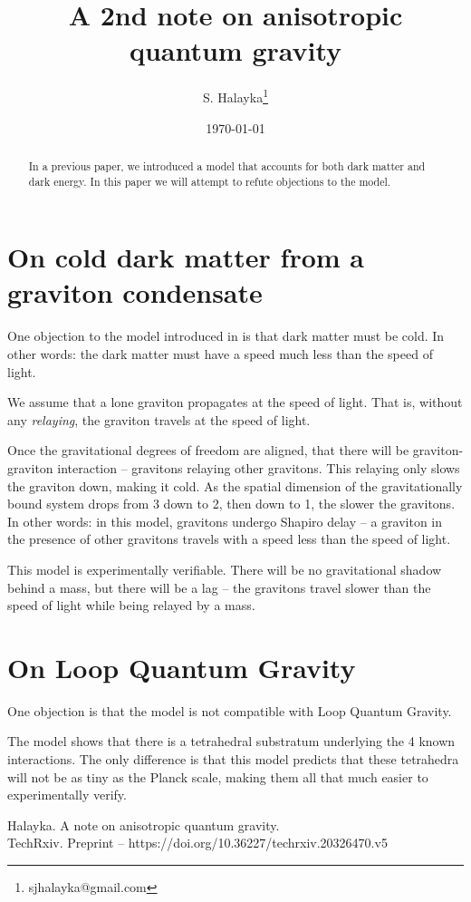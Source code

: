 \documentclass[12pt]{article}
\title{A 2nd note on anisotropic quantum gravity}
\author{S. Halayka\footnote{sjhalayka@gmail.com}}
\date{\today\;\currenttime}
\begin{document}
 
\maketitle

\begin{abstract}
In a previous paper, we introduced a model that accounts for both dark matter and dark energy. In this paper we will attempt to refute objections to the model.
\end{abstract}


\section{On cold dark matter from a graviton condensate}

One objection to the model introduced in \cite{halayka} is that dark matter must be cold. 
In other words: the dark matter must have a speed much less than the speed of light.

We assume that a lone graviton propagates at the speed of light. 
That is, without any {\textit{relaying}}, the graviton travels at the speed of light.

Once the gravitational degrees of freedom are aligned, that there will be graviton-graviton interaction -- gravitons relaying other gravitons. 
This relaying only slows the graviton down, making it cold. 
As the spatial dimension of the gravitationally bound system drops from 3 down to 2, then down to 1, the slower the gravitons.
In other words: in this model, gravitons undergo Shapiro delay -- a graviton in the presence of other gravitons travels with a speed less than the speed of light.

This model is experimentally verifiable. 
There will be no gravitational shadow behind a mass, but there will be a lag -- the gravitons travel slower than the speed of light while being relayed by a mass.






\section{On Loop Quantum Gravity}

One objection is that the model is not compatible with Loop Quantum Gravity.

The model shows that there is a tetrahedral substratum underlying the 4 known interactions.
The only difference is that this model predicts that these tetrahedra will not be as tiny as the Planck scale, making them all that much easier to experimentally verify.







\begin{thebibliography}{9}

 Halayka. A note on anisotropic quantum gravity.\\TechRxiv. Preprint -- https://doi.org/10.36227/techrxiv.20326470.v5


\end{thebibliography}
\end{document}
